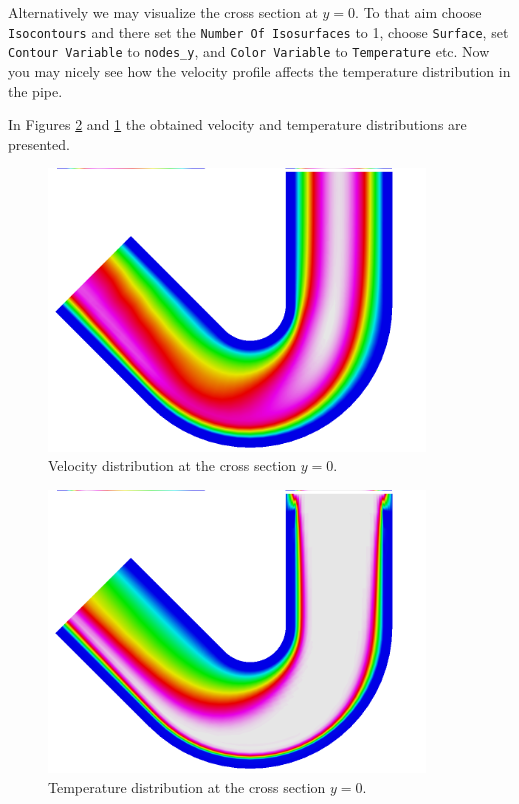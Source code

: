 Alternatively we may visualize the cross section at $y=0$. To that aim choose 
\texttt{Isocontours} and there set the \texttt{Number Of Isosurfaces} to 1, 
choose \texttt{Surface}, set \texttt{Contour Variable} to \texttt{nodes\_y}, and 
\texttt{Color Variable} to \texttt{Temperature} etc. Now you may nicely see how the 
velocity profile affects the temperature distribution in the pipe.

In Figures \ref{fg:curved_pipe_temp} and \ref{fg:curved_pipe_velo} the obtained velocity and temperature 
distributions are presented. 

\begin{figure}[h]
\centering
\includegraphics[width=10cm, viewport=0 8 1024 750,clip]{curved_pipe_velo_crosssection}
\caption{Velocity distribution at the cross section $y=0$.}\label{fg:curved_pipe_velo}
\end{figure} 

\begin{figure}[h]
\centering
\includegraphics[width=10cm, viewport=0 8 1024 750,clip]{curved_pipe_temp_crosssection}
\caption{Temperature distribution at the cross section $y=0$.}\label{fg:curved_pipe_temp}
\end{figure} 



\hfill
